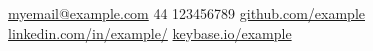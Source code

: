 
\nobreakvspace{0.3em}  %


\noindent\href{mailto:myemail@example.com}{myemail\mbox{}@\mbox{}example.com}\sbull
\textsmaller{+}44 123456789\sbull
\href{https://github.com/example}{github.com/example}\sbull
\href{https://www.linkedin.com/in/example/}{linkedin.com/in/example/}\sbull
\href{https://keybase.io/example}{keybase.io/example}

\spacedhrule{0.9em}{-0.4em}  %